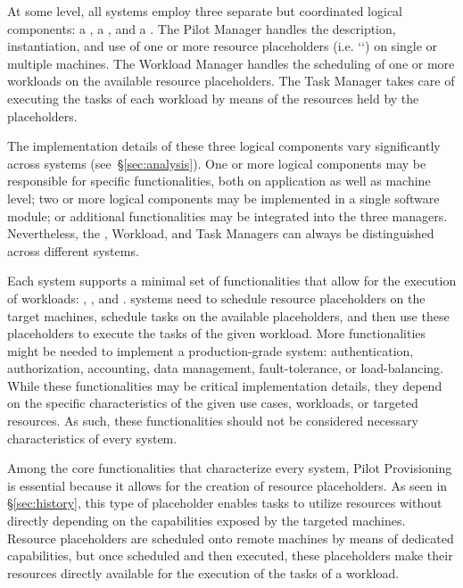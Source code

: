 \documentclass{sig-alternate}
\begin{document}

At some level, all \pilotjob systems employ three separate but coordinated
logical components: a , a , and a
. The Pilot Manager handles the description, instantiation,
and use of one or more resource placeholders (i.e. `\pilots`) on single or
multiple machines. The Workload Manager handles the scheduling of one or more
workloads on the available resource placeholders. The Task Manager takes care of
executing the tasks of each workload by means of the resources held by the
placeholders.

The implementation details of these three logical components vary significantly
across \pilotjob systems (see~\S\ref{sec:analysis}). One or more logical
components may be responsible for specific functionalities, both on application
as well as machine level; two or more logical components may be implemented in a
single software module; or additional functionalities may be integrated into the
three managers. Nevertheless, the \pilot, Workload, and Task Managers can always
be distinguished across different \pilotjob systems.

Each \pilotjob system supports a minimal set of functionalities that allow for
the execution of workloads: , , and . \pilotjob systems need to schedule
resource placeholders on the target machines, schedule tasks on the available
placeholders, and then use these placeholders to execute the tasks of the given
workload. More functionalities might be needed to implement a production-grade
\pilotjob system: authentication, authorization, accounting, data management,
fault-tolerance, or load-balancing. While these functionalities may be critical
implementation details, they depend on the specific characteristics of the given
use cases, workloads, or targeted resources. As such, these functionalities
should not be considered necessary characteristics of every \pilotjob
system. 

Among the core functionalities that characterize every \pilotjob system, Pilot
Provisioning is essential because it allows for the creation of resource
placeholders. As seen in \S\ref{sec:history}, this type of placeholder enables
tasks to utilize resources without directly depending on the capabilities
exposed by the targeted machines. Resource placeholders are scheduled onto
remote machines by means of dedicated capabilities, but once scheduled and then
executed, these placeholders make their resources directly available for the
execution of the tasks of a workload. 
\end{document}
